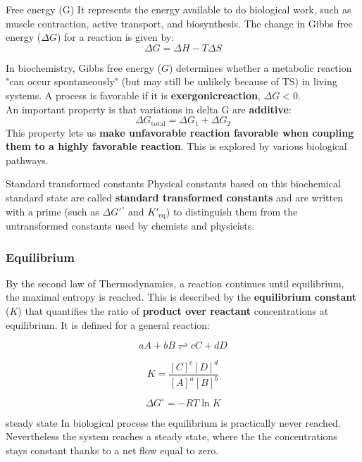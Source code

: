 \documentclass[../main.tex]{subfiles}
\begin{document}
\begin{DefWithTitle}{Free energy (G)}
	It represents the energy available to do biological work, such as muscle contraction, active transport, and biosynthesis. The change in Gibbs free energy (\(\Delta G\)) for a reaction is given by:
	\[
	\Delta G = \Delta H - T \Delta S
	\]
\end{DefWithTitle} 
In biochemistry, Gibbs free energy (\(G\)) determines whether a metabolic reaction "can occur spontaneously" (but may still be unlikely because of TS) in living systems. A process is favorable if it is \textbf{\gls{exergonicreaction}}, \(\Delta G < 0\).\\
An important property is that variations in delta G are \textbf{additive}:
\[
\Delta G_{\text{total}} = \Delta G_1 + \Delta G_2
\]
This property lets us \textbf{make unfavorable reaction favorable when coupling them to a highly favorable reaction}. This is explored by various biological pathways.

\begin{RemarkWithTitel}{Standard transformed constants}
	Physical constants based on this biochemical standard state are called \textbf{standard transformed constants} and are written with a prime (such as \( \Delta G'^\circ \) and \( K'_{\text{eq}} \)) to distinguish them from the untransformed constants used by chemists and physicists.
\end{RemarkWithTitel}

\subsubsection{Equilibrium}
By the second law of Thermodynamics, a reaction continues until equilibrium, the maximal entropy is reached. This is described by the \textbf{equilibrium constant} (\(K\)) that  quantifies the ratio of \textbf{product over reactant} concentrations at equilibrium. It is defined for a general reaction:

\[
aA + bB \rightleftharpoons cC + dD
\]

\[
K = \frac{[C]^c [D]^d}{[A]^a [B]^b}
\]

\[
\Delta G^\circ = -RT \ln K
\]

\begin{RemarkWithTitel}{steady state}
	In biological process the equilibrium is practically never reached. Nevertheless the system reaches a steady state, where the the concentrations stays constant thanks to a net flow equal to zero. 
\end{RemarkWithTitel}
\end{document}

